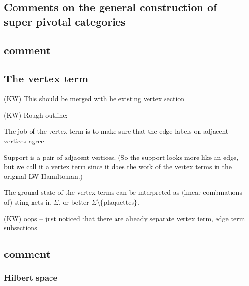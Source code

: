\documentclass[12pt,a4paper]{article}
\newcommand{\kw}[1]{{\color{kwcolor}\footnotesize{(KW) #1}}}
\begin{document}
\subsection{Comments on the general construction of super pivotal categories}
 
 


 
\subsection{comment}		%

\subsection{The vertex term}

\kw{This should be merged with he existing vertex section}

\kw{Rough outline:}

The job of the vertex term is to make sure that the edge labels on adjacent vertices agree.

Support is a pair of adjacent vertices.
(So the support looks more like an edge, but we call it a vertex term since it does the 
work of the vertex terms in the original LW Hamiltonian.)

The ground state of the vertex terms can be interpreted as (linear combinations of) sting nets in $\Sigma$,
or better $\Sigma \setminus \{ \mbox{plaquettes}\}$.


\kw{oops -- just noticed that there are already separate vertex term, edge term subsections}

 
 

 
\subsection{comment}
\subsubsection{Hilbert space} \label{hilbert_space}
\end{document}
